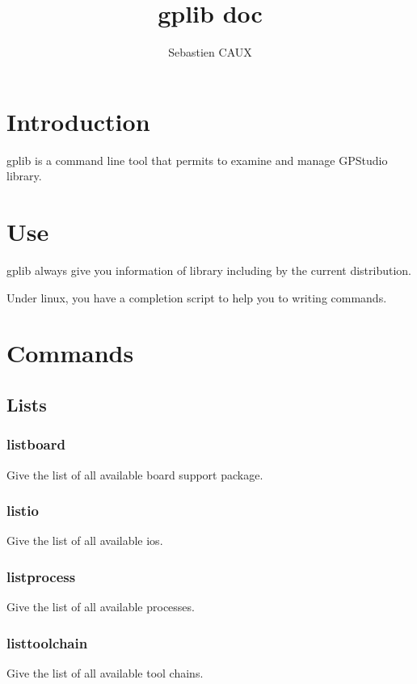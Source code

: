 \documentclass[10pt,a4paper]{article}
\author{Sebastien CAUX}
\title{gplib doc \version}
\begin{document}
\maketitle
\section{Introduction}
gplib is a command line tool that permits to examine and manage GPStudio library.

\section{Use}
gplib always give you information of library including by the current distribution.

Under linux, you have a completion script to help you to writing commands.

\section{Commands}
\subsection{Lists}
\subsubsection{listboard}

Give the list of all available board support package.


\subsubsection{listio}

Give the list of all available ios.


\subsubsection{listprocess}

Give the list of all available processes.


\subsubsection{listtoolchain}

Give the list of all available tool chains.

\end{document}
